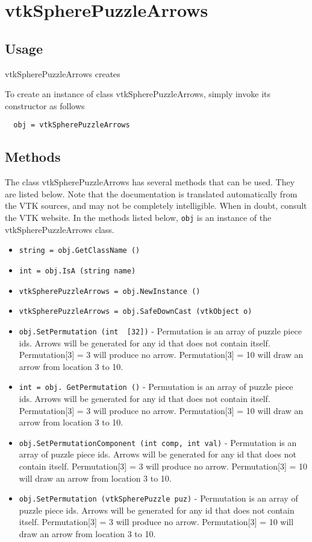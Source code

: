 \section{vtkSpherePuzzleArrows}

\subsection{Usage}

 vtkSpherePuzzleArrows creates 

To create an instance of class vtkSpherePuzzleArrows, simply
invoke its constructor as follows
\begin{verbatim}
  obj = vtkSpherePuzzleArrows
\end{verbatim}
\subsection{Methods}

The class vtkSpherePuzzleArrows has several methods that can be used.
  They are listed below.
Note that the documentation is translated automatically from the VTK sources,
and may not be completely intelligible.  When in doubt, consult the VTK website.
In the methods listed below, \verb|obj| is an instance of the vtkSpherePuzzleArrows class.
\begin{itemize}
\item  \verb|string = obj.GetClassName ()|

\item  \verb|int = obj.IsA (string name)|

\item  \verb|vtkSpherePuzzleArrows = obj.NewInstance ()|

\item  \verb|vtkSpherePuzzleArrows = obj.SafeDownCast (vtkObject o)|

\item  \verb|obj.SetPermutation (int  [32])| -  Permutation is an array of puzzle piece ids.
 Arrows will be generated for any id that does not contain itself.
 Permutation[3] = 3 will produce no arrow.
 Permutation[3] = 10 will draw an arrow from location 3 to 10.

\item  \verb|int = obj. GetPermutation ()| -  Permutation is an array of puzzle piece ids.
 Arrows will be generated for any id that does not contain itself.
 Permutation[3] = 3 will produce no arrow.
 Permutation[3] = 10 will draw an arrow from location 3 to 10.

\item  \verb|obj.SetPermutationComponent (int comp, int val)| -  Permutation is an array of puzzle piece ids.
 Arrows will be generated for any id that does not contain itself.
 Permutation[3] = 3 will produce no arrow.
 Permutation[3] = 10 will draw an arrow from location 3 to 10.

\item  \verb|obj.SetPermutation (vtkSpherePuzzle puz)| -  Permutation is an array of puzzle piece ids.
 Arrows will be generated for any id that does not contain itself.
 Permutation[3] = 3 will produce no arrow.
 Permutation[3] = 10 will draw an arrow from location 3 to 10.

\end{itemize}
